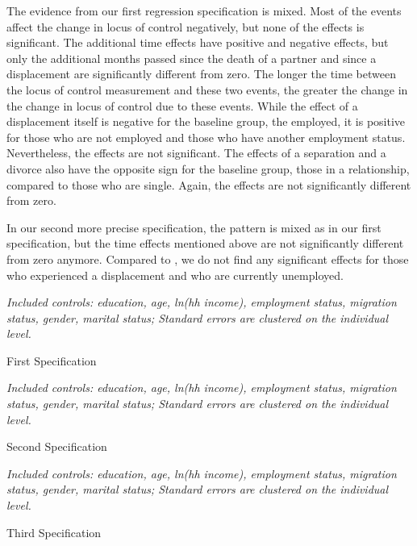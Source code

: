 \documentclass[12pt, a4paper, fleqn, parskip]{scrartcl}
\begin{document}
The evidence from our first regression specification is mixed. Most of the events affect
the change in locus of control negatively, but none of the effects is significant. The
additional time effects have positive and negative effects, but only the additional
months passed since the death of a partner and since a displacement are significantly
different from zero. The longer the time between the locus of control measurement and
these two events, the greater the change in the change in locus of control due to these
events. While the effect of a displacement itself is negative for the baseline group,
the employed, it is positive for those who are not employed and those who have another
employment status. Nevertheless, the effects are not significant. The effects of a
separation and a divorce also have the opposite sign for the baseline group, those in a
relationship, compared to those who are single. Again, the effects are not significantly
different from zero.

In our second more precise specification, the pattern is mixed as in our first
specification, but the time effects mentioned above are not significantly different from
zero anymore. Compared to \citet{preuss2017}, we do not find any significant effects for
those who experienced a displacement and who are currently unemployed.

\begin{table}[H]
    \tiny{}
    \footnotesize \textit{Included controls: education, age, ln(hh income), employment
    status, migration status, gender, marital status; Standard errors are clustered on
    the individual level.}
    \caption{First Specification}
    \label{tab:first_reg}
\end{table}


\begin{table}[H]
    \tiny{}
    \footnotesize \textit{Included controls: education, age, ln(hh income), employment
    status, migration status, gender, marital status; Standard errors are clustered on
    the individual level.}
    \caption{Second Specification}
    \label{tab:second_reg}
\end{table}

\begin{table}[H]
    
    \footnotesize \textit{Included controls: education, age, ln(hh income), employment
    status, migration status, gender, marital status; Standard errors are clustered on
    the individual level.}
    \caption{Third Specification}
    \label{tab:third_reg}
\end{table}
\end{document}

